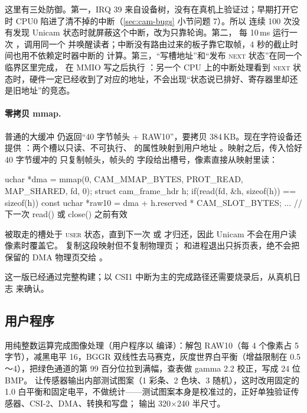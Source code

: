 这里有三处防御。第一，IRQ 39 来自设备树，没有在真机上验证过；早期打开它时 CPU0 陷进了清不掉的中断（\ref{sec:cam-bugs} 小节问题 7）。所以  连续 100 次没有发现 Unicam 状态时就屏蔽这个中断，改为只靠轮询。第二， 每 10\,ms 运行一次 ，调用同一个  并唤醒读者；中断没有路由过来的板子靠它取帧，4 秒的截止时间也用不依赖定时器中断的  计算。第三，“写槽地址”和“发布 \textsc{next} 状态”在同一个  临界区里完成， 在 MMIO 写之后执行 ：另一个 CPU 上的中断处理看到 \textsc{next} 状态时，硬件一定已经收到了对应的地址，不会出现“状态说已排好、寄存器里却还是旧地址”的竞态。

\paragraph{零拷贝 mmap.} 普通的大缓冲  仍返回“40 字节帧头 + RAW10”，要拷贝 384\,KB。现在字符设备还提供 ：两个槽以只读、不可执行、 的属性映射到用户地址 。映射之后，传入恰好 40 字节缓冲的  只复制帧头，帧头的  字段给出槽号，像素直接从映射里读：

\begin{ccode}
uchar *dma = mmap(0, CAM_MMAP_BYTES, PROT_READ, MAP_SHARED, fd, 0);
struct cam_frame_hdr h;
if(read(fd, &h, sizeof(h)) == sizeof(h)){
  const uchar *raw10 = dma + h.reserved * CAM_SLOT_BYTES;
  ...                                   // 下一次 read() 或 close() 之前有效
}
\end{ccode}

被取走的槽处于 \textsc{user} 状态，直到下一次  或  才归还，因此 Unicam 不会在用户读像素时覆盖它。 复制这段映射但不复制物理页； 和进程退出只拆页表，绝不会把保留的 DMA 物理页交给 。

这一版已经通过完整构建；以 CSI1 中断为主的完成路径还需要烧录后，从真机日志  来确认。

\subsection{用户程序 }

 用纯整数运算完成图像处理（用户程序以  编译）：解包 RAW10（每 4 个像素占 5 字节），减黑电平 16，BGGR 双线性去马赛克，灰度世界白平衡（增益限制在 0.5～4），把绿色通道的第 99 百分位拉到满幅，查表做 gamma 2.2 校正，写成 24 位 BMP。 让传感器输出内部测试图案（1 彩条、2 色块、3 随机），这时改用固定的 1.0 白平衡和固定电平，不做统计——测试图案本身是校准过的，正好单独验证传感器、CSI-2、DMA、转换和写盘； 输出 320$\times$240 半尺寸。

